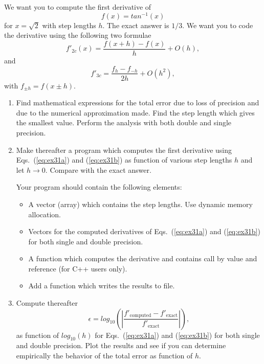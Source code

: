 \documentclass[10pt,a4paper,english,fleqn]{report}
\begin{document}
We want you to compute the first derivative of
\[
   f(x)=tan^{-1}(x) 
\]
for $x=\sqrt{2}$ with step lengths $h$. 
The exact answer is
$1/3$.
We want you to code the derivative using the following two
formulae 
\begin{equation}
    f'_{2c}(x)= \frac{f(x+h)-f(x)}{h}+O(h),
\label{eq:ex31a}
\end{equation}
and 
\begin{equation} 
   f'_{3c}=\frac{f_h-f_{-h}}{2h}+O(h^2),
\label{eq:ex31b}
\end{equation}
with $f_{\pm h}=f(x\pm h)$.



\begin{enumerate}
\item Find mathematical expressions for the total error due to loss
of precision and due to the numerical approximation made.
Find the step length which gives the smallest value.
Perform the analysis with both double and single precision.

\item Make thereafter a program 
which computes the first derivative using Eqs.~(\ref{eq:ex31a}) and (\ref{eq:ex31b}) 
as function of various step lengths $h$ and let $h\rightarrow 0$.
Compare with the exact answer.

Your program should contain the following elements:  
\begin{itemize}
 \item A vector (array)  which contains the step lengths. 
Use dynamic memory allocation.
 \item Vectors for the computed derivatives of Eqs.~(\ref{eq:ex31a}) and (\ref{eq:ex31b}) 
for both single and double precision.
\item A function which computes the derivative and contains call by value and reference 
(for C++ users only).

 \item Add a function which writes the results to file.
\end{itemize}
\item Compute thereafter
\[
   \epsilon=log_{10}\left(\left|\frac{f'_{\mathrm{computed}}-f'_{\mathrm{exact}}}
                 {f'_{\mathrm{exact}}}\right|\right),
\]
as function of  $log_{10}(h)$ for Eqs.~(\ref{eq:ex31a}) and (\ref{eq:ex31b})  
for both single and double precision.
Plot the results and see if you can determine empirically 
the behavior of the total error as function of $h$.
\end{enumerate}
\newpage
\end{document}
